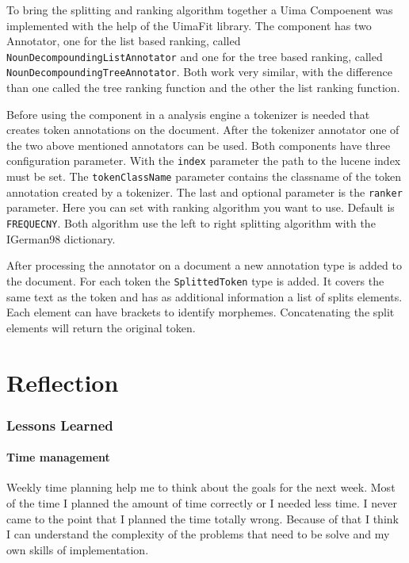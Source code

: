 \documentclass[11pt, accentcolor=tud9b, nochapname]{tudreport}
\begin{document}
To bring the splitting and ranking algorithm together a Uima Compoenent was implemented with the help of the UimaFit library. The component has two Annotator, one for the list based ranking, called \texttt{NounDecompoundingListAnnotator} and one for the tree based ranking, called \texttt{NounDecompoundingTreeAnnotator}. Both work very similar, with the difference than one called the tree ranking function and the other the list ranking function.

Before using the component in a analysis engine a tokenizer is needed that creates token annotations on the document. After the tokenizer annotator one of the two above mentioned annotators can be used. Both components have three configuration parameter. With the \texttt{index} parameter the path to the lucene index must be set. The \texttt{tokenClassName} parameter contains the classname of the token annotation created by a tokenizer. The last and optional parameter is the \texttt{ranker} parameter. Here you can set with ranking algorithm you want to use. Default is \texttt{FREQUECNY}. Both algorithm use the left to right splitting algorithm with the IGerman98 dictionary.

After processing the annotator on a document a new annotation type is added to the document. For each token the \texttt{SplittedToken} type is added. It covers the same text as the token and has as additional information a list of splits elements. Each element can have brackets to identify morphemes. Concatenating the split elements will return the original token.

\chapter{Reflection}

\subsection{Lessons Learned}

\subsubsection{Time management}

Weekly time planning help me to think about the goals for the next week. Most of the time I planned the amount of time correctly or I needed less time. I never came to the point that I planned the time totally wrong. Because of that I think I can understand the complexity of the problems that need to be solve and my own skills of implementation.
\end{document}
